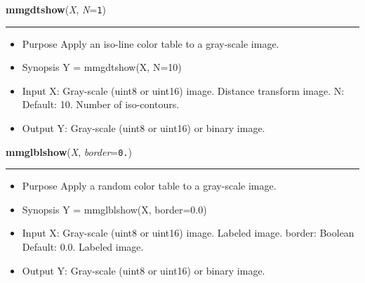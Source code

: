     \begin{boxedminipage}{\textwidth}

    \raggedright \textbf{mmgdtshow}(\textit{X}, \textit{N}=\texttt{1\-})

    \vspace{-1.5ex}

    \rule{\textwidth}{0.5\fboxrule}
    \begin{itemize}
    \setlength{\parskip}{0.6ex}
      \item Purpose Apply an iso-line color table to a gray-scale image.

      \item Synopsis Y = mmgdtshow(X, N=10)

      \item Input X: Gray-scale (uint8 or uint16) image. Distance transform 
        image. N: Default: 10. Number of iso-contours.

      \item Output Y: Gray-scale (uint8 or uint16) or binary image.

    \end{itemize}

    \vspace{1ex}

    \end{boxedminipage}

    \label{multireg:num_pymorph:mmglblshow}
    \vspace{0.5ex}

    \begin{boxedminipage}{\textwidth}

    \raggedright \textbf{mmglblshow}(\textit{X}, \textit{border}=\texttt{0\-.\-})

    \vspace{-1.5ex}

    \rule{\textwidth}{0.5\fboxrule}
    \begin{itemize}
    \setlength{\parskip}{0.6ex}
      \item Purpose Apply a random color table to a gray-scale image.

      \item Synopsis Y = mmglblshow(X, border=0.0)

      \item Input X: Gray-scale (uint8 or uint16) image. Labeled image. 
        border: Boolean Default: 0.0. Labeled image.

      \item Output Y: Gray-scale (uint8 or uint16) or binary image.

    \end{itemize}

    \vspace{1ex}

    \end{boxedminipage}

